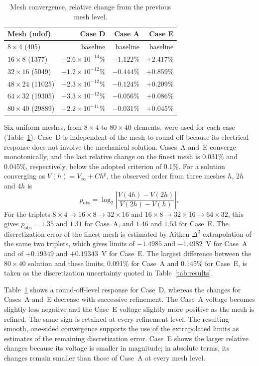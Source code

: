 \documentclass[a4paper, 11pt, twoside]{article}
\begin{document}
\begin{table}[h]
\centering
\caption{Mesh convergence, relative change from the previous mesh level.}
\label{tab:mesh}
\begin{tabular}{@{}lrrr@{}}
\toprule
Mesh (ndof) & Case D & Case A & Case E \\
\midrule
$8\times4$ (405) & baseline & baseline & baseline \\
$16\times8$ (1377) & $-2.6\times10^{-14}\%$ & $-1.122\%$ & $+2.417\%$ \\
$32\times16$ (5049) & $+1.2\times10^{-12}\%$ & $-0.444\%$ & $+0.859\%$ \\
$48\times24$ (11025) & $+2.3\times10^{-12}\%$ & $-0.124\%$ & $+0.209\%$ \\
$64\times32$ (19305) & $+3.3\times10^{-12}\%$ & $-0.056\%$ & $+0.086\%$ \\
$80\times40$ (29889) & $-2.2\times10^{-11}\%$ & $-0.031\%$ & $+0.045\%$ \\
\bottomrule
\end{tabular}
\end{table}

Six uniform meshes, from $8\times4$ to $80\times40$ elements, were used for each case
(Table~\ref{tab:mesh}). Case~D is independent of the mesh to round-off because its
electrical response does not involve the mechanical solution. Cases~A and~E converge
monotonically, and the last relative change on the finest mesh is 0.031\% and 0.045\%,
respectively, below the adopted criterion of 0.1\%. For a solution converging as
$V(h)=V_\infty+Ch^p$, the observed order from three meshes $h$, $2h$ and $4h$ is
\begin{equation}
p_{\mathrm{obs}}
=\log_2\left|\frac{V(4h)-V(2h)}{V(2h)-V(h)}\right|,
\label{eq:pobs}
\end{equation}
For the triplets $8\times4\to16\times8\to32\times16$ and
$16\times8\to32\times16\to64\times32$, this gives $p_{\mathrm{obs}}=1.35$ and
$1.31$ for Case~A, and $1.46$ and $1.53$ for Case~E. The discretization error of the
finest mesh is estimated by Aitken $\Delta^2$ extrapolation of the same two triplets,
which gives limits of $-1.4985$ and $-1.4982$~V for Case~A and of
$+0.19349$ and $+0.19343$~V for Case~E. The largest difference between the
$80\times40$ solution and these limits, 0.091\% for Case~A and 0.145\% for Case~E,
is taken as the discretization uncertainty quoted in Table~\ref{tab:results}.

Table~\ref{tab:mesh} shows a round-off-level response for Case~D, whereas the changes
for Cases~A and~E decrease with successive refinement. The Case~A voltage becomes
slightly less negative and the Case~E voltage slightly more positive as the mesh is
refined. The same sign is retained at every refinement level. The resulting smooth,
one-sided convergence supports the use of the extrapolated limits as estimates of the
remaining discretization error. Case~E shows the larger relative changes because its
voltage is smaller in magnitude; in absolute terms, its changes remain smaller than
those of Case~A at every mesh level.
\end{document}
